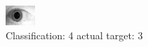 \begin{figure}[h!]
\begin{center}
\includegraphics[width=0.60\columnwidth]{figures/ID1864_class_4_target_3.png}
\end{center}
\caption{ Classification: 4 actual target: 3}
\label{fig:ID1864_class_4_target_3}
\end{figure}
